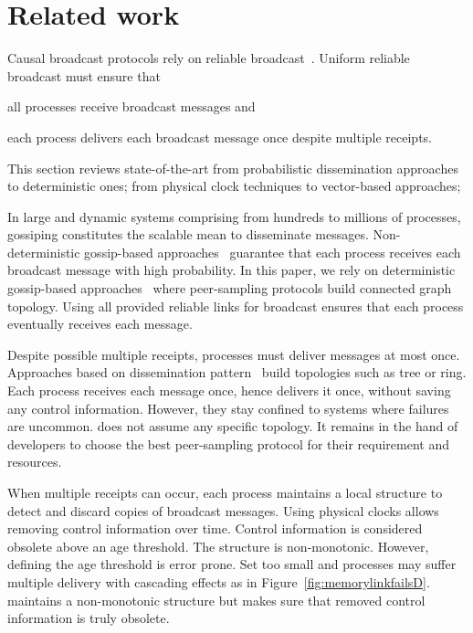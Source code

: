 
\section{Related work}
\label{sec:relatedwork}

Causal broadcast protocols rely on reliable
broadcast~\cite{hadzilacos1994modular}. Uniform reliable broadcast must ensure
that
\begin{inparaenum}[(i)]
\item all processes receive broadcast messages and
\item each process delivers each broadcast message once despite multiple
  receipts.
\end{inparaenum} This section reviews state-of-the-art from probabilistic
dissemination approaches to deterministic ones; from physical clock techniques
to vector-based approaches;

In large and dynamic systems comprising from hundreds to millions of processes,
gossiping constitutes the  scalable mean to disseminate
messages. Non-deterministic gossip-based
approaches~\cite{birman1999bimodal,demers1987epidemic} guarantee that each
process receives each broadcast message with high probability. In this paper, we
rely on deterministic gossip-based approaches~\cite{nedelec2017adaptive} where
peer-sampling protocols build connected graph topology. Using all provided
reliable links for broadcast ensures that each process eventually receives each
message.

Despite possible multiple receipts, processes must deliver messages at most
once. Approaches based on dissemination
pattern~\cite{bravo2017saturn,raynal2013distributed} build topologies such as
tree or ring. Each process receives each message once, hence delivers it once,
without saving any control information. However, they stay confined to systems
where failures are uncommon. \RPCBROADCAST does not assume any specific
topology. It remains in the hand of developers to choose the best peer-sampling
protocol for their requirement and resources.

When multiple receipts can occur, each process maintains a local structure to
detect and discard copies of broadcast messages. Using physical clocks allows
removing control information over time. Control information is considered
obsolete above an age threshold. The structure is non-monotonic. However,
defining the age threshold is error prone. Set too small and processes may
suffer multiple delivery with cascading effects as in
Figure~\ref{fig:memorylinkfailsD}. \RPCBROADCAST maintains a non-monotonic
structure but makes sure that removed control information is truly obsolete.

